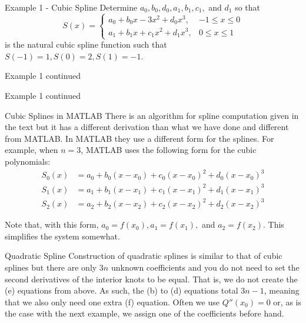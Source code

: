\documentclass[12pt]{beamer}
\begin{document}
\begin{frame}{Example 1 - Cubic Spline}
Determine $a_0,b_0,d_0,a_1,b_1,c_1,$ and $d_1$ so that
\[
S(x) = \left\{
\begin{array}{ll}
     a_0+b_0x-3x^2+d_0x^3, & -1 \leq x\leq 0 \\
     a_1+b_1x+c_1x^2+d_1x^3, & 0 \leq x\leq 1 
\end{array}
\right. \]
is the natural cubic spline function such that $S(-1)=1, S(0)=2,S(1)=-1$.
\vspace{2 in}
\end{frame}

\begin{frame}{Example 1 continued}

\end{frame}

\begin{frame}{Example 1 continued}

\end{frame}

\begin{frame}{Cubic Splines in MATLAB}
There is an algorithm for spline computation given in the text but it has a different derivation than what we have done and different from MATLAB. In MATLAB they use a different form for the splines. For example, when $n=3$, MATLAB uses the following form for the cubic polynomials:
\begin{align*}
     S_0(x) &= a_0+b_0(x-x_0)+c_0(x-x_0)^2+d_0(x-x_0)^3 \\
     S_1(x) &= a_1+b_1(x-x_1)+c_1(x-x_1)^2+d_1(x-x_1)^3 \\
     S_2(x) &= a_2+b_2(x-x_2)+c_2(x-x_2)^2+d_2(x-x_2)^3
\end{align*}


Note that, with this form, $a_0=f(x_0), a_1=f(x_1),$ and $a_2=f(x_2)$. This simplifies the system somewhat.

\end{frame}

\begin{frame}{Quadratic Spline}
Construction of quadratic splines is similar to that of cubic splines but there are only $3n$ unknown coefficients and you do not need to set the second derivatives of the interior knots to be equal. That is, we do not create the (e) equations from above. As such, the (b) to (d) equations total $3n-1$, meaning that we also only need one extra (f) equation. Often we use $Q''(x_0)=0$ or, as is the case with the next example, we assign one of the coefficients before hand.
\end{frame}
\end{document}

